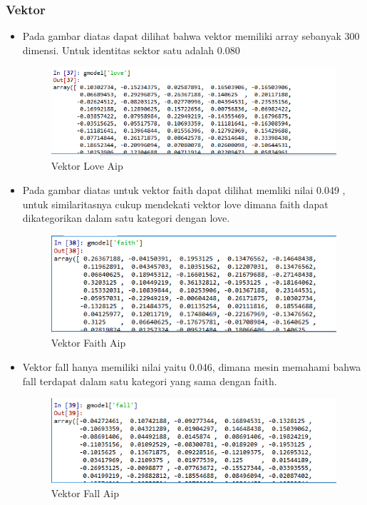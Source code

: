\subsubsection{Vektor}
\begin{itemize}
\item Pada gambar diatas dapat dilihat bahwa vektor memiliki array sebanyak 300 dimensi. Untuk identitas sektor satu adalah 0.080
\begin{figure}[!hbtp]
\centering
\includegraphics[scale=0.5]{figures/AIP/e4.PNG}
\caption{Vektor Love Aip}
\label{Praktek}
\end{figure}


\item Pada gambar diatas untuk vektor faith dapat dilihat memliki nilai 0.049 , untuk similaritasnya cukup mendekati vektor love dimana faith dapat dikategorikan dalam satu kategori dengan love.
\begin{figure}[!hbtp]
\centering
\includegraphics[scale=0.5]{figures/AIP/e5.PNG}
\caption{Vektor Faith Aip}
\label{Praktek}
\end{figure}


\item Vektor fall hanya memiliki nilai yaitu 0.046, dimana mesin memahami bahwa fall terdapat dalam satu kategori yang sama dengan  faith.
\begin{figure}[!hbtp]
\centering
\includegraphics[scale=0.5]{figures/AIP/e6.PNG}
\caption{Vektor Fall Aip}
\label{Praktek}
\end{figure}



\end{itemize}
